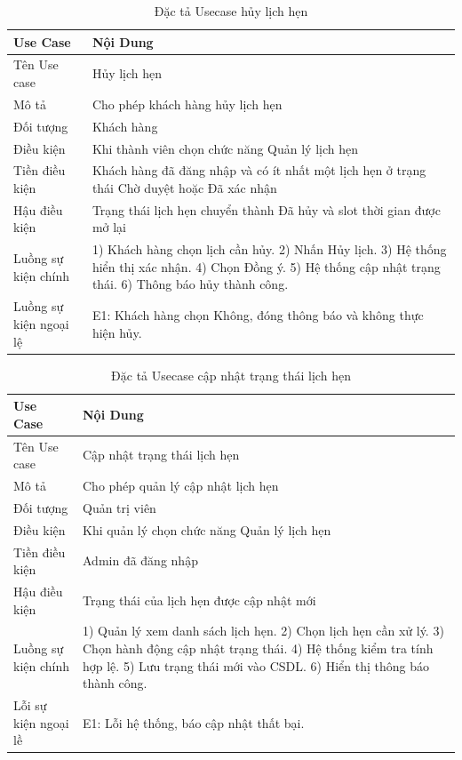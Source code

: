 \documentclass[../BTL.tex]{subfiles}
\begin{document}
\begin{longtable}{|p{}|p{}|}
\caption{Đặc tả Usecase hủy lịch hẹn}\label{tab:usecase-huy-lich-hen}\\
\hline
\textbf{Use Case} & \textbf{Nội Dung} \\
\hline
Tên Use case & Hủy lịch hẹn \\
\hline
Mô tả & Cho phép khách hàng hủy lịch hẹn \\
\hline
Đối tượng & Khách hàng \\
\hline
Điều kiện & Khi thành viên chọn chức năng Quản lý lịch hẹn \\
\hline
Tiền điều kiện & Khách hàng đã đăng nhập và có ít nhất một lịch hẹn ở trạng thái Chờ duyệt hoặc Đã xác nhận \\
\hline
Hậu điều kiện & Trạng thái lịch hẹn chuyển thành Đã hủy và slot thời gian được mở lại \\
\hline
Luồng sự kiện chính & 1) Khách hàng chọn lịch cần hủy. 2) Nhấn Hủy lịch. 3) Hệ thống hiển thị xác nhận. 4) Chọn Đồng ý. 5) Hệ thống cập nhật trạng thái. 6) Thông báo hủy thành công. \\
\hline
Luồng sự kiện ngoại lệ & E1: Khách hàng chọn Không, đóng thông báo và không thực hiện hủy. \\
\hline
\end{longtable}

\begin{longtable}{|p{}|p{}|}
\caption{Đặc tả Usecase cập nhật trạng thái lịch hẹn}\label{tab:usecase-cap-nhat-trang-thai-lich-hen}\\
\hline
\textbf{Use Case} & \textbf{Nội Dung} \\
\hline
Tên Use case & Cập nhật trạng thái lịch hẹn \\
\hline
Mô tả & Cho phép quản lý cập nhật lịch hẹn \\
\hline
Đối tượng & Quản trị viên \\
\hline
Điều kiện & Khi quản lý chọn chức năng Quản lý lịch hẹn \\
\hline
Tiền điều kiện & Admin đã đăng nhập \\
\hline
Hậu điều kiện & Trạng thái của lịch hẹn được cập nhật mới \\
\hline
Luồng sự kiện chính & 1) Quản lý xem danh sách lịch hẹn. 2) Chọn lịch hẹn cần xử lý. 3) Chọn hành động cập nhật trạng thái. 4) Hệ thống kiểm tra tính hợp lệ. 5) Lưu trạng thái mới vào CSDL. 6) Hiển thị thông báo thành công. \\
\hline
Lỗi sự kiện ngoại lề & E1: Lỗi hệ thống, báo cập nhật thất bại. \\
\hline
\end{longtable}
\end{document}
